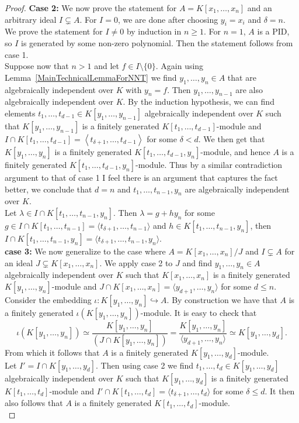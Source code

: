 \begin{proof}
        \noindent\textbf{Case 2:} We now prove the statement for $A = K[x_1,\dots,x_n]$ and an arbitrary ideal $I\subsetneq A$. For $I=0$, we are done after choosing $y_i = x_i$ and $\delta = n$. We prove the statement for $I\neq 0$ by induction in $n\geq 1$. For $n=1$, $A$ is a PID, so $I$ is generated by some non-zero polynomial. Then the statement follows from case 1.\\ 
        Suppose now that $n>1$ and let $f\in I\setminus\{0\}$. Again using Lemma~\ref{MainTechnicalLemmaForNNT} we find $y_1,\dots,y_n\in A$ that are algebraically independent over $K$ with $y_n = f$. Then $y_1,\dots,y_{n-1}$ are also algebraically independent over $K$. By the induction hypothesis, we can find elements $t_1,\dots, t_{d-1} \in K[y_1,\dots, y_{n-1}]$ algebraically independent over $K$ such that $K[y_1,\dots,y_{n-1}]$ is a finitely generated $K[t_1,\dots,t_{d-1}]$-module and $I \cap K[t_1,\dots, t_{d-1}] = \left\langle t_{\delta+1},\dots, t_{d-1} \right\rangle$ for some $\delta <d$. We then get that $K[y_1,\dots, y_n]$ is a finitely generated $K[t_1,\dots, t_{d-1},y_n]$-module, and hence $A$ is a finitely generated $K[t_1,\dots, t_{d-1},y_n]$-module. Thus by a similar contradiction argument to that of case 1 {\Large I feel there is an argument that captures the fact better}, we conclude that $d=n$ and $t_1,\dots,t_{n-1},y_n$ are algebraically independent over $K$.\\ 
        Let $\lambda\in I\cap K[t_1,\dots,t_{n-1},y_n]$. Then $\lambda= g+hy_n$ for some $g\in I\cap K[t_1,\dots, t_{n-1}]=\langle t_{\delta+1},\dots,t_{n-1}\rangle$ and $h\in K[t_1,\dots, t_{n-1},y_n]$, then $I\cap K[t_1,\dots,t_{n-1},y_n]=\langle t_{\delta+1},\dots,t_{n-1},y_n\rangle$.\\

        \noindent \textbf{case 3:} We now generalize to the case where $A = K[x_1,\dots, x_n]/J$ and $I\subsetneq A$ for an ideal $J\subsetneq K[x_1,\dots,x_n]$. We apply case 2 to $J$ and find $y_1,\dots, y_n\in A$ algebraically independent over $K$ such that $K[x_1,\dots, x_n]$ is a finitely generated $K[y_1,\dots,y_n]$-module and $J\cap K[x_1,\dots,x_n]=\langle y_{d+1},\dots,y_{n}\rangle$ for some $d\leq n$. Consider the embedding $\iota : K[y_1,\dots, y_n] \hookrightarrow A$. By construction we have that $A$ is a finitely generated $\iota(K[y_1,\dots,y_n])$-module. It is easy to check that $$\iota(K[y_1,\dots,y_n])\simeq \frac{K[y_1,\dots,y_n]}{(J\cap K[y_1,\dots,y_n])} = \frac{K[y_1,\dots,y_n]}{\langle y_{d+1},\dots,y_n\rangle} \simeq K[y_1,\dots, y_d].$$  
        From which it follows that $A$ is a finitely generated $K[y_1,\dots, y_d]$-module.\\ 
        Let $I'=I\cap K[y_1,\dots,y_d]$. Then using case 2 we find $t_1,\dots,t_d\in K[y_1,\dots, y_d]$ algebraically independent over $K$ such that $K[y_1,\dots,y_d]$ is a finitely generated $K[t_1,\dots,t_d]$-module and $I'\cap K[t_1,\dots,t_d] = \langle t_{\delta +1},\dots, t_d\rangle$ for some $\delta \leq d$. It then also follows that $A$ is a finitely generated $K[t_1,\dots, t_d]$-module.\\ 
         

\end{proof}
